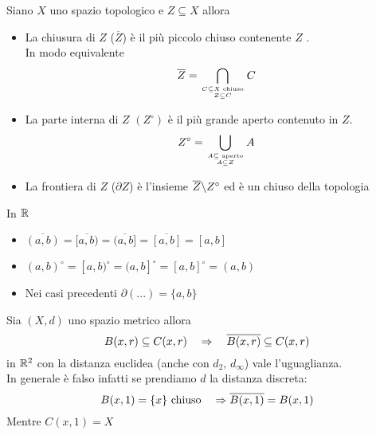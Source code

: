 \newpage
\begin{defn}\bianco 
Siano $X$ uno spazio topologico e $Z\subseteq X $ allora 
\begin{itemize}
\item La chiusura di $Z$ ($\overline{Z}$) \`e il pi\`u piccolo chiuso contenente $Z$ .\\
In modo equivalente $$\overline{Z}=\bigcap_{ C\subseteq  X \text{ chiuso} \atop{ Z\subseteq C}} C $$
\item La parte interna di $Z$ $\left( Z^\circ \right) $ \`e il pi\`u grande aperto contenuto in $Z$.
$$ Z^\circ =\bigcup_{A\subseteq \text{ aperto}\atop{A\subseteq Z}} A$$
\item La frontiera di $Z$ ($\partial Z $) \`e l'insieme $\overline{Z}\backslash Z^\circ $  ed \`e un chiuso della topologia
\end{itemize}
\end{defn}
\begin{ese}In $\mathbb{R}$ 
 \begin{itemize}
\item $\overline{(a,b)}=\overline{[a,b)}=\overline{(a,b]}=\overline{[a,b]}=[a,b]$ 
\item $(a,b)^\circ=[a,b)^\circ=(a,b]^\circ=[a,b]^\circ=(a,b)$ 
\item Nei casi precedenti $\partial ( ...) = \{ a,b \} $
\end{itemize}
\end{ese}
\spazio
\begin{oss}Sia $(X,d)$ uno spazio metrico allora 
$$ B(x,r)\subseteq C(x,r) \quad \Rightarrow \quad \overline{B(x,r)}\subseteq C(x,r)$$
in $\mathbb{R}^2$ con la distanza euclidea (anche con $d_2, \, d_\infty$) vale l'uguaglianza.\\
In generale \`e falso infatti se prendiamo $d$ la distanza discreta:
$$ B(x,1)=\{x\} \text{ chiuso} \quad \Rightarrow \overline{B(x,1)}=B(x,1)$$
Mentre $C(x,1)=X$
\end{oss}
\spazio 

